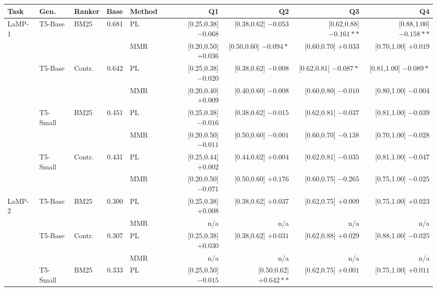 \documentclass[10pt]{article}
\begin{document}
\begin{table}[p]
\centering
\tiny
\begin{tabular}{@{}lllrlrrrr@{}}
\toprule
Task & Gen. & Ranker & Base & Method & Q1 & Q2 & Q3 & Q4 \\
\midrule
\multirow{2}{*}{LaMP-1} & \multirow{2}{*}{T5-Base} & \multirow{2}{*}{BM25} & \multirow{2}{*}{0.681} & PL & [0.25,0.38] $-0.068$ & [0.38,0.62] $-0.053$ & [0.62,0.88] $-0.161**$ & [0.88,1.00] $-0.158**$ \\
 &  &  &  & MMR & [0.20,0.50] $+0.036$ & [0.50,0.60] $-0.094*$ & [0.60,0.70] $+0.033$ & [0.70,1.00] $+0.019$ \\
\cmidrule(lr){1-9}
 & \multirow{2}{*}{T5-Base} & \multirow{2}{*}{Contr.} & \multirow{2}{*}{0.642} & PL & [0.25,0.38] $-0.020$ & [0.38,0.62] $-0.008$ & [0.62,0.81] $-0.087*$ & [0.81,1.00] $-0.089*$ \\
 &  &  &  & MMR & [0.20,0.40] $+0.009$ & [0.40,0.60] $-0.008$ & [0.60,0.80] $-0.010$ & [0.80,1.00] $-0.004$ \\
\cmidrule(lr){1-9}
 & \multirow{2}{*}{T5-Small} & \multirow{2}{*}{BM25} & \multirow{2}{*}{0.451} & PL & [0.25,0.38] $-0.016$ & [0.38,0.62] $-0.015$ & [0.62,0.81] $-0.037$ & [0.81,1.00] $-0.039$ \\
 &  &  &  & MMR & [0.20,0.50] $-0.011$ & [0.50,0.60] $-0.001$ & [0.60,0.70] $-0.138$ & [0.70,1.00] $-0.028$ \\
\cmidrule(lr){1-9}
 & \multirow{2}{*}{T5-Small} & \multirow{2}{*}{Contr.} & \multirow{2}{*}{0.431} & PL & [0.25,0.44] $+0.002$ & [0.44,0.62] $+0.004$ & [0.62,0.81] $-0.035$ & [0.81,1.00] $-0.047$ \\
 &  &  &  & MMR & [0.20,0.50] $-0.071$ & [0.50,0.60] $+0.176$ & [0.60,0.75] $-0.265$ & [0.75,1.00] $-0.025$ \\
\midrule
\multirow{2}{*}{LaMP-2} & \multirow{2}{*}{T5-Base} & \multirow{2}{*}{BM25} & \multirow{2}{*}{0.300} & PL & [0.25,0.38] $+0.008$ & [0.38,0.62] $+0.037$ & [0.62,0.75] $+0.009$ & [0.75,1.00] $+0.023$ \\
 &  &  &  & MMR & n/a & n/a & n/a & n/a \\
\cmidrule(lr){1-9}
 & \multirow{2}{*}{T5-Base} & \multirow{2}{*}{Contr.} & \multirow{2}{*}{0.307} & PL & [0.25,0.38] $+0.030$ & [0.38,0.62] $+0.031$ & [0.62,0.88] $+0.029$ & [0.88,1.00] $-0.025$ \\
 &  &  &  & MMR & n/a & n/a & n/a & n/a \\
\cmidrule(lr){1-9}
 & \multirow{2}{*}{T5-Small} & \multirow{2}{*}{BM25} & \multirow{2}{*}{0.333} & PL & [0.25,0.50] $-0.015$ & [0.50,0.62] $+0.642**$ & [0.62,0.75] $+0.001$ & [0.75,1.00] $+0.011$ \\

\end{tabular}
\end{table}
\end{document}
